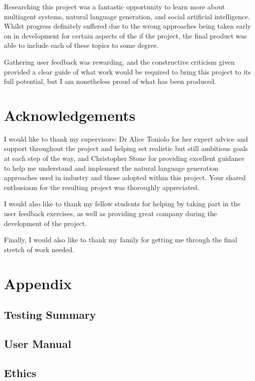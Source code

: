 \documentclass{article}
\begin{document}
Researching this project was a fantastic opportunity to learn more about multiagent systems, natural language generation, and social artificial intelligence. Whilst progress definitely suffered due to the wrong approaches being taken early on in development for certain aspects of the if the project, the final product was able to include each of these topics to some degree. 

Gathering user feedback was rewarding, and the constructive criticism given provided a clear guide of what work would be required to bring this project to its full potential, but I am nonetheless proud of what has been produced.

\section{Acknowledgements}

I would like to thank my supervisors: Dr Alice Toniolo for her expert advice and support throughout the project and helping set realistic but still ambitious goals at each step of the way, and Christopher Stone for providing excellent guidance to help me understand and implement the natural language generation approaches used in industry and those adopted within this project. Your shared enthusiasm for the resulting project was thoroughly appreciated.

I would also like to thank my fellow students for helping by taking part in the user feedback exercises, as well as providing great company during the development of the project.

Finally, I would also like to thank my family for getting me through the final stretch of work needed. 





\section{Appendix}

\subsection{Testing Summary}
\subsection{User Manual}
\subsection{Ethics}

\vspace{12pt}
\end{document}

